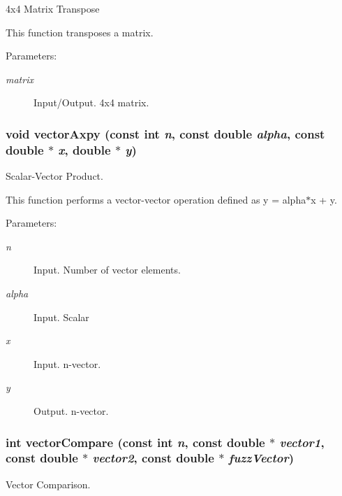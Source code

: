 4x4 Matrix Transpose 

This function transposes a matrix.

\begin{Desc}
\item[Parameters:]
\begin{description}
\item[{\em matrix}]Input/Output. 4x4 matrix. \end{description}
\end{Desc}
\hypertarget{group__a_g3498940945f9d5437032454f4838350c}{
\subsubsection[vectorAxpy]{\setlength{\rightskip}{0pt plus 5cm}void vectorAxpy (const int {\em n}, \/  const double {\em alpha}, \/  const double $\ast$ {\em x}, \/  double $\ast$ {\em y})}}
\label{group__a_g3498940945f9d5437032454f4838350c}


Scalar-Vector Product. 

This function performs a vector-vector operation defined as y = alpha$\ast$x + y.

\begin{Desc}
\item[Parameters:]
\begin{description}
\item[{\em n}]Input. Number of vector elements. \item[{\em alpha}]Input. Scalar \item[{\em x}]Input. n-vector. \item[{\em y}]Output. n-vector. \end{description}
\end{Desc}
\hypertarget{group__a_gfc9e8bb8b888bf8f1577f0f04ec74f09}{
\subsubsection[vectorCompare]{\setlength{\rightskip}{0pt plus 5cm}int vectorCompare (const int {\em n}, \/  const double $\ast$ {\em vector1}, \/  const double $\ast$ {\em vector2}, \/  const double $\ast$ {\em fuzzVector})}}
\label{group__a_gfc9e8bb8b888bf8f1577f0f04ec74f09}


Vector Comparison. 

